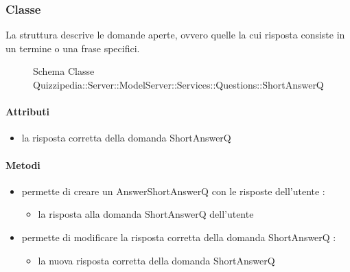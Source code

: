 \subsubsection{Classe }
La struttura descrive le domande aperte, ovvero quelle la cui risposta consiste in un termine o una frase specifici.
\begin{figure}[H]
\centering
\noindent{}
\caption[Schema Classe ShortAnswerQ]{Schema Classe Quizzipedia::Server::ModelServer::Services::Questions::ShortAnswerQ}
\end{figure}
\paragraph{Attributi}
\begin{itemize}
\item {}
\newline
la risposta corretta della domanda ShortAnswerQ
\end{itemize}
\paragraph{Metodi}
\begin{itemize}
\item {}
\newline
permette di creare un AnswerShortAnswerQ con le risposte dell'utente
\newline
{} :
\begin{itemize}
\item {}
\newline
la risposta alla domanda ShortAnswerQ dell'utente
\end{itemize}
\item {}
\newline
permette di modificare la risposta corretta della domanda ShortAnswerQ
\newline
{} :
\begin{itemize}
\item {}
\newline
la nuova risposta corretta della domanda ShortAnswerQ
\end{itemize}
\end{itemize}
